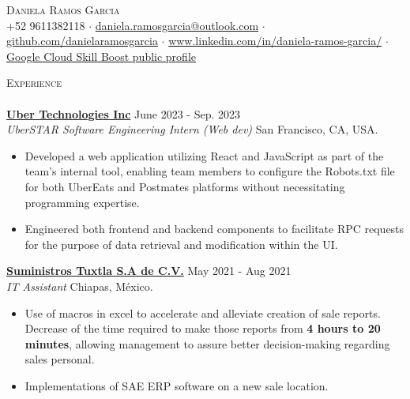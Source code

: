 \documentclass[a4paper]{article}
\newcommand{\lineunder} {
    \vspace*{-8pt} \\
    \hspace*{-18pt} \hrulefill \\
}
\newcommand{\header} [1] {
        {\hspace*{-18pt}\vspace*{6pt} \textsc{#1}}
    \vspace*{-6pt} \lineunder
}
\begin{document}
    \vspace*{-30pt}



    \vspace*{-20pt}
    \begin{center}
    {\Huge \scshape {Daniela Ramos Garcia}}\\
    \vspace{2mm}
    {\normalsize {+52 9611382118} $\cdot${ \href{mailto: daniela.ramosgarcia@outlook.com}{daniela.ramosgarcia@outlook.com} $\cdot$  \href{https://github.com/danielaramosgarcia}{github.com/danielaramosgarcia} $\cdot$ \href{https://www.linkedin.com/in/daniela-ramos-garcia/}{www.linkedin.com/in/daniela-ramos-garcia/} $\cdot$ \href{ https://www.cloudskillsboost.google/public_profiles/b21b25e4-9a28-4a6f-a8bd- 7eeb556ea04a}{Google Cloud Skill Boost public profile}
    \\}}
    \end{center}

    \header{Experience}
    \vspace{1mm}
    \textbf{\href{https://www.uber.com/}{Uber Technologies Inc}} \hfill June 2023 - Sep. 2023\\
    \textit{UberSTAR Software Engineering Intern (Web dev)} \hfill San Francisco, CA, USA.\\
    \vspace{-1.5mm}
    \begin{itemize} \itemsep 1pt
    \item Developed a web application utilizing React and JavaScript as part of the team's internal tool, enabling team members to configure the Robots.txt file for both UberEats and Postmates platforms without necessitating programming expertise.
    \item Engineered both frontend and backend components to facilitate RPC requests for the purpose of data retrieval and modification within the UI.
    \end{itemize}

    \textbf{\href{https://suministrostuxtla.com.mx}{Suministros Tuxtla S.A de C.V.}} \hfill May 2021 - Aug 2021\\
    \textit{IT Assistant} \hfill Chiapas, México.\\
    \vspace{-1.5mm}
    \begin{itemize} \itemsep -1pt
    \item  Use of macros in excel to accelerate and alleviate creation of sale reports. Decrease of the time required to make those reports from \textbf{4 hours to 20 minutes}, allowing management to
    assure better decision-making regarding sales personal.
    \item Implementations of SAE ERP software on a new sale location.
    \end{itemize}
\end{document}
